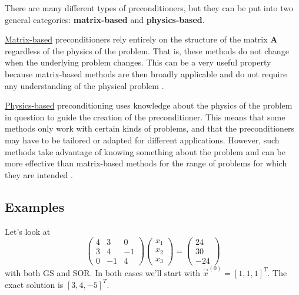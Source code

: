 \documentclass[12pt]{article}
\newcommand{\ve}[1]{\ensuremath{\mathbf{#1}}}
\begin{document}
There are many different types of preconditioners, but they can be put into two general categories: \textbf{matrix-based} and \textbf{physics-based}.

\underline{Matrix-based} preconditioners rely entirely on the structure of the matrix $\ve{A}$ regardless of the physics of the problem. That is, these methods do not change when the underlying problem changes. This can be a very useful property because matrix-based methods are then broadly applicable and do not require any understanding of the physical problem \cite{Trefethen1997}. %

\underline{Physics-based} preconditioning uses knowledge about the physics of the problem in question to guide the creation of the preconditioner. This means that some methods only work with certain kinds of problems, and that the preconditioners may have to be tailored or adapted for different applications. However, such methods take advantage of knowing something about the problem and can be more effective than matrix-based methods for the range of problems for which they are intended \cite{Trefethen1997}. %


\subsection{Examples}

Let's look at 
%
\begin{equation}
\begin{pmatrix}
  4  &  3 & 0 \\
  3  &  4 & -1 \\
  0  & -1 & 4
\end{pmatrix}
%
\begin{pmatrix} x_1 \\ x_2 \\ x_3 \end{pmatrix} 
%
= \begin{pmatrix} 24 \\ 30 \\ -24 \end{pmatrix} \nonumber
\end{equation}
%
with both GS and SOR. In  both cases we'll start with $\vec{x}^{(0)} = [1, 1, 1]^T$. The exact solution is $[3, 4, -5]^T$. 
\end{document}
